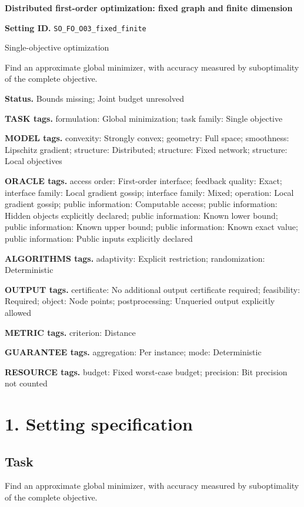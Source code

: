 \documentclass[10pt,a4paper]{article}
\begin{document}
\raggedright

{\LARGE\bfseries\sffamily\color{AtlasNavy} Distributed first-order optimization: fixed graph and finite dimension\par}\vspace{5pt}
\textbf{Setting ID.} \texttt{SO\_\allowbreak{}FO\_\allowbreak{}O03\_\allowbreak{}fixed\_\allowbreak{}finite}

Single-objective optimization

Find an approximate global minimizer, with accuracy measured by suboptimality of the complete objective.

\textbf{Status.} Bounds missing; Joint budget unresolved

\textbf{TASK tags.} formulation: Global minimization; task family: Single objective

\textbf{MODEL tags.} convexity: Strongly convex; geometry: Full space; smoothness: Lipschitz gradient; structure: Distributed; structure: Fixed network; structure: Local objectives

\textbf{ORACLE tags.} access order: First-order interface; feedback quality: Exact; interface family: Local gradient gossip; interface family: Mixed; operation: Local gradient gossip; public information: Computable access; public information: Hidden objects explicitly declared; public information: Known lower bound; public information: Known upper bound; public information: Known exact value; public information: Public inputs explicitly declared

\textbf{ALGORITHMS tags.} adaptivity: Explicit restriction; randomization: Deterministic

\textbf{OUTPUT tags.} certificate: No additional output certificate required; feasibility: Required; object: Node points; postprocessing: Unqueried output explicitly allowed

\textbf{METRIC tags.} criterion: Distance

\textbf{GUARANTEE tags.} aggregation: Per instance; mode: Deterministic

\textbf{RESOURCE tags.} budget: Fixed worst-case budget; precision: Bit precision not counted

\section{1. Setting specification}
\subsection{Task}
Find an approximate global minimizer, with accuracy measured by suboptimality of the complete objective.
\end{document}
